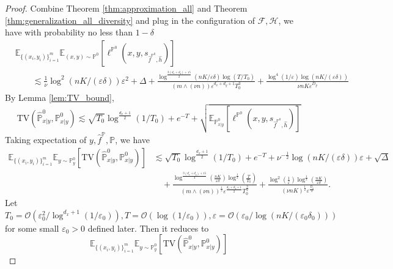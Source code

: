 \documentclass{article}
\numberwithin{equation}{section}
\newcommand{\E}{\mathbb{E}}
\theoremstyle{definition}
\renewcommand{\P}{\mathbb{P}}
\begin{document}
\begin{proof}
    Combine Theorem \ref{thm:approximation_all} and Theorem \ref{thm:generalization_all_diversity} and plug in the configuration of $\mathcal{F},\mathcal{H}$, we have with probability no less than $1-\delta$
    \begin{equation}
        \begin{aligned}
            &\E_{\{(x_i,y_i)\}_{i=1}^m} \E_{(x,y)\sim\P^0} [\ell^{\P^0}(x,y,s_{\widehat{f}^{\P^0},\widehat{h}})] \\
            &\qquad \lesssim 
            \frac{1}{\nu}\log^2(nK/(\varepsilon\delta))\varepsilon^2+\Delta+\frac{\log^{\frac{3(d_x+d_y)+15}{2}}(nK/\varepsilon\delta)\log(T/T_0)}{(m\wedge (\nu n))\varepsilon^{d_x+d_y+1}T_0^3}+\frac{\log^4(1/\varepsilon)\log(nK/(\varepsilon\delta))}{\nu nK\varepsilon^{D_y}}
        \end{aligned}
    \end{equation}
    By Lemma \ref{lem:TV_bound},
    \begin{equation}
        \mathrm{TV}(\widehat{\P}^0_{x|y},\P^0_{x|y})
        \lesssim \sqrt{T_0}\log^{\frac{d_x+1}{2}}(1/T_0)+e^{-T}+\sqrt{\E_{\P^0_{x|y}}[\ell^{\P^0}(x,y,s_{\widehat{f}^{\P^0},\widehat{h}})]}
    \end{equation}
    Taking expectation of $y,\widehat{f}^\P,\P$, we have
    \begin{equation}
        \begin{aligned}
            \E_{\{(x_i,y_i)\}_{i=1}^m}\E_{y\sim\P^0_y} [\mathrm{TV}(\widehat{\P}^0_{x|y},\P^0_{x|y})]
            &\lesssim \sqrt{T_0}\log^{\frac{d_x+1}{2}}(1/T_0)+e^{-T} + \nu^{-\frac{1}{2}}\log(nK/(\varepsilon\delta))\varepsilon + \sqrt{\Delta} \\
            &\quad +\frac{\log^{\frac{3(d_x+d_y)+15}{4}}(\frac{nK}{\varepsilon\delta})\log^{\frac{1}{2}}(\frac{T}{T_0})}{(m\wedge (\nu n))^{\frac{1}{2}}\varepsilon^{\frac{d_x+d_y+1}{2}}T_0^{\frac{3}{2}}}+\frac{\log^2(\frac{1}{\varepsilon})\log^{\frac{1}{2}}(\frac{nK}{\varepsilon\delta})}{(\nu nK)^{\frac{1}{2}}\varepsilon^{\frac{D_y}{2}}}.
        \end{aligned}
    \end{equation}
    Let $T_0=\mathcal{O}\left(\varepsilon_0^2/\log^{d_x+1}(1/\varepsilon_0)\right), T=\mathcal{O}(\log(1/\varepsilon_0)), \varepsilon=\mathcal{O}(\varepsilon_0/\log(nK/(\varepsilon_0\delta_0)))$ for some small $\varepsilon_0>0$ defined later.
    Then it reduces to
    \begin{equation}
        \E_{\{(x_i,y_i)\}_{i=1}^m}\E_{y\sim\P^0_y} [\mathrm{TV}(\widehat{\P}^0_{x|y},\P^0_{x|y})]

\end{equation}
\end{proof}
\end{document}
